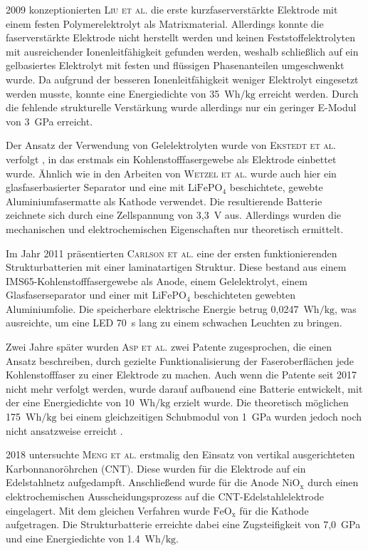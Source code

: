 2009 konzeptionierten \textsc{Liu et al.} \cite{Liu2009} die erste kurzfaserverstärkte Elektrode mit einem festen Polymerelektrolyt als Matrixmaterial. Allerdings konnte die faserverstärkte Elektrode nicht herstellt werden und keinen Feststoffelektrolyten mit ausreichender Ionenleitfähigkeit gefunden werden, weshalb schließlich auf ein gelbasiertes Elektrolyt mit festen und flüssigen Phasenanteilen umgeschwenkt wurde. Da aufgrund der besseren Ionenleitfähigkeit weniger Elektrolyt eingesetzt werden musste, konnte eine Energiedichte von 35~$\si{\watt \hour \per \kg}$ erreicht werden. Durch die fehlende strukturelle Verstärkung wurde allerdings nur ein geringer E-Modul von 3~GPa erreicht.

Der Ansatz der Verwendung von Gelelektrolyten wurde von \textsc{Ekstedt et al.} verfolgt \cite{Ekstedt2010}, in das erstmals ein Kohlenstofffasergewebe als Elektrode einbettet wurde. Ähnlich wie in den Arbeiten von \textsc{Wetzel et al.} wurde auch hier ein glasfaserbasierter Separator und eine mit $\text{LiFePO}_\text{4}$ beschichtete, gewebte Aluminiumfasermatte als Kathode verwendet. Die resultierende Batterie zeichnete sich durch eine Zellspannung von 3,3~V aus. Allerdings wurden die mechanischen und elektrochemischen Eigenschaften nur theoretisch ermittelt.

Im Jahr 2011 präsentierten \textsc{Carlson et al.} \cite{Carlson2011} eine der ersten funktionierenden Strukturbatterien mit einer laminatartigen Struktur. Diese bestand aus einem IMS65-Kohlenstofffasergewebe als Anode, einem Gelelektrolyt, einem Glasfaserseparator und einer mit $\text{LiFePO}_\text{4}$ beschichteten gewebten Aluminiumfolie. Die speicherbare elektrische Energie betrug 0,0247~$\si{\watt \hour \per \kg}$, was ausreichte, um eine LED 70~s lang zu einem schwachen Leuchten zu bringen.

Zwei Jahre später wurden \textsc{Asp et al.} \cite{Asp2013US,Asp2013CN} zwei Patente zugesprochen, die einen Ansatz beschreiben, durch gezielte Funktionalisierung der Faseroberflächen jede Kohlenstofffaser zu einer Elektrode zu machen. Auch wenn die Patente seit 2017 nicht mehr verfolgt werden, wurde darauf aufbauend eine Batterie entwickelt, mit der eine Energiedichte von 10~$\si{\watt \hour \per \kg}$ erzielt wurde. Die theoretisch möglichen 175~$\si{\watt \hour \per \kg}$ bei einem gleichzeitigen Schubmodul von 1~GPa wurden jedoch noch nicht ansatzweise erreicht \cite{Leijonmarck2013, Carlson2013}.

2018 untersuchte \textsc{Meng et al.} \cite{Meng2018} erstmalig den Einsatz von vertikal ausgerichteten Karbonnanoröhrchen (CNT). Diese wurden für die Elektrode auf ein Edelstahlnetz aufgedampft. Anschließend wurde für die Anode $\text{NiO}_\text{x}$ durch einen elektrochemischen Ausscheidungsprozess auf die CNT-Edelstahlelektrode eingelagert. Mit dem gleichen Verfahren wurde $\text{FeO}_\text{x}$ für die Kathode aufgetragen. Die Strukturbatterie erreichte dabei eine Zugsteifigkeit von 7,0~GPa und eine Energiedichte von 1.4~$\si{\watt \hour \per \kg}$.

